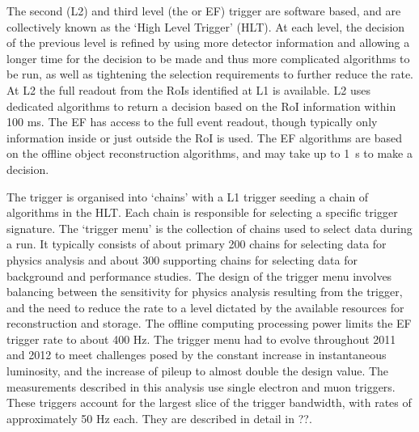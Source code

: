The second (L2) and third level (the  or EF) trigger are software based, and are collectively known as the
`High Level Trigger' (HLT). At each level, the decision of the previous level is
refined by using more detector information and allowing a longer time for the
decision to be made and thus more complicated algorithms to be run, as well as
tightening the selection requirements to further reduce the rate. At L2 the full
readout from the RoIs identified at L1 is available. L2 uses dedicated
algorithms to return a decision based on the RoI information within 100 ms. The
EF has access to the full event readout, though typically only information
inside or just outside the RoI is used. The EF algorithms are based on the
offline object reconstruction algorithms, and may take up to 1~s to make
a decision.

The trigger is organised into `chains' with a L1 trigger seeding a chain of
algorithms in the HLT. Each chain is responsible for selecting a specific
trigger signature. The `trigger menu' is the collection of chains used to select
data during a run. It typically consists of about primary 200 chains for selecting data
for physics analysis and about 300 supporting chains for selecting data for
background and performance studies. The design of the trigger menu involves
balancing between the sensitivity for physics analysis resulting from the
trigger, and the need to reduce the rate to a level dictated by the available
resources for reconstruction and storage. The offline computing processing power
limits the EF trigger rate to about 400 Hz. The trigger menu had to evolve
throughout 2011 and 2012 to meet challenges posed by the constant increase in
instantaneous luminosity, and the increase of pileup to almost double the design
value. The measurements described in this analysis use single electron and muon
triggers. These triggers account for the largest slice of the trigger bandwidth,
with rates of approximately 50 Hz each. They are described in detail in ??.

